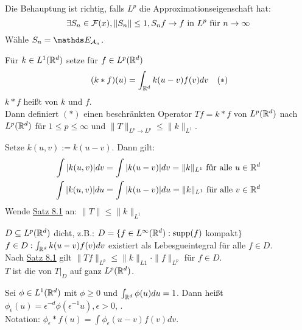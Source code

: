 \begin{beweis}
	Die Behauptung ist richtig, falls $L^{p}$ die Approximationseigenschaft hat:
	\[ \exists S_{n} \in \mathcal{F}(x), \| S_{n} \| \leq 1, S_{n} f \rightarrow f \text{ in } L^{p} \text{ für } n \rightarrow \infty \]
	Wähle $S_{n} = \EW_{\ca_{n}}$.
\end{beweis}


\begin{satz}[Young] \label{satz:8.5-Young} 
	Für $k \in L^{1}(\mathbb{R}^{d})$ setze für $f \in L^{p}(\mathbb{R}^{d})$
	\[ (k \ast f) (u) = \int_{\MdR^{d}} k(u - v) f(v) dv \quad (*) \label{eq:8.5-Young} \]
	$k \ast f$ hei{\ss}t  von $k$ und $f$. \\
	Dann definiert \hyperref[eq:8.5-Young]{$(*)$} einen beschränkten Operator $T f = k \ast f$ von $L^{p}(\mathbb{R}^{d})$ nach $L^{p}(\mathbb{R}^{d})$ für $1 \leq p \leq \infty$ und $\|T\|_{L^{p} \rightarrow L^{p}} \leq \|k\|_{L^{1}}$.
\end{satz}

\begin{beweis}
	Setze $k(u, v) := k(u - v)$. Dann gilt:
	\begin{align*}
		\int |k(u, v)| dv & = \int | k(u - v) | dv = \| k \|_{L^{1}} \text{ für alle } u \in \mathbb{R}^{d} \\
			\int |k(u, v)| d u& = \int | k(u - v) | du = \| k \|_{L^{1}} \text{ für alle } v \in \mathbb{R}^{d} \\
	\end{align*}	
	Wende \hyperref[satz:8.1]{Satz 8.1} an: $\| T \| \leq \| k \|_{L^{1}}$
\end{beweis}


\begin{bemerkung*}
	$D \subseteq L^{p}(\mathbb{R}^{d})$ dicht, z.B.: $D = \{ f \in L^{\infty}(\mathbb{R}^{d}): \operatorname{supp}(f)$ kompakt$\}$
	$f \in D: \int_{\mathbb{R}^{d}} k(u - v) f(v) dv$ existiert als Lebesgueintegral für alle $f \in D$. \\
	Nach \hyperref[satz:8.1]{Satz 8.1} gilt $\| T f \|_{L^{p}} \leq \| k \|_{L{1}} \cdot \| f \|_{L^{p}}$ für $f \in D$. \\
	$T$ ist die  von $T|_{D}$ auf ganz $L^{p}(\mathbb{R}^{d})$.
\end{bemerkung*}


\begin{definition}
	Sei $\phi \in L^{1}(\mathbb{R}^{d})$ mit $\phi \geq 0$ und $\int_{\mathbb{R}^{d}} \phi(u) du = 1$. Dann hei{\ss}t $\phi_{\epsilon}(u) = \epsilon^{-d} \phi(\epsilon^{-1} u), \epsilon > 0$,	. \\
	Notation: $\phi_{\epsilon} \ast f(u) = \int \phi_{\epsilon}(u - v) f(v) dv$.
\end{definition}


